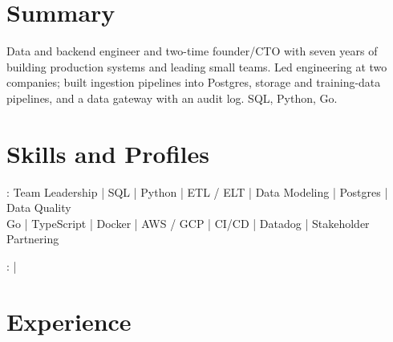 \documentclass[print]{jack-resume}
\begin{document}
\pagecolor{darkmodeBackground}


\begin{minipage}[t][1cm][t]{.03\textwidth}
    \hfill
\end{minipage}

\section{Summary}
Data and backend engineer and two-time founder/CTO with seven years of building production systems and leading small teams. Led engineering at two companies; built ingestion pipelines into Postgres, storage and training-data pipelines, and a data gateway with an audit log. SQL, Python, Go.
\sectionsep

\section{Skills and Profiles}
:
Team Leadership \hfill | \hfill
SQL \hfill | \hfill
Python \hfill | \hfill
ETL / ELT \hfill | \hfill
Data Modeling \hfill | \hfill
Postgres \hfill | \hfill
Data Quality \\
\hspace{1.0cm} Go \hfill | \hfill
TypeScript \hfill | \hfill
Docker \hfill | \hfill
AWS / GCP \hfill | \hfill
CI/CD \hfill | \hfill
Datadog \hfill | \hfill
Stakeholder Partnering \\

\raggedright{
    :
      \href{https://www.linkedin.com/in/jack-sturtevant/}{ \ExternalLink} |
     \href{https://github.com/jacksturt}{ \ExternalLink}}

\section{Experience}
\end{document}
